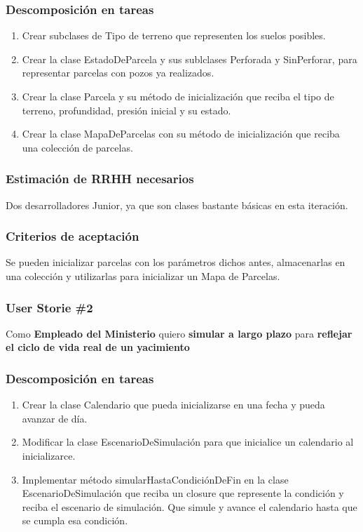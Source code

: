 \documentclass[10pt,a4paper]{article}
\begin{document}
\subsubsection*{Descomposición en tareas}

\begin{enumerate}
  \item Crear subclases de Tipo de terreno que representen los suelos posibles.
  \item Crear la clase EstadoDeParcela y sus sublclases Perforada y SinPerforar, para representar parcelas con pozos ya realizados.
  \item Crear la clase Parcela y su método de inicialización que reciba el tipo de terreno, profundidad, presión inicial y su estado.
  \item Crear la clase MapaDeParcelas con su método de inicialización que reciba una colección de parcelas.
\end{enumerate}

\subsubsection*{Estimación de RRHH necesarios}

Dos desarrolladores Junior, ya que son clases bastante básicas en esta iteración.

\subsubsection*{Criterios de aceptación}

Se pueden inicializar parcelas con los parámetros dichos antes, almacenarlas en una colección y utilizarlas para inicializar un Mapa de Parcelas.

\subsubsection{User Storie \#2}
\begin{framed}
  Como \textbf{Empleado del Ministerio} quiero \textbf{simular a largo plazo} para \textbf{reflejar el ciclo de vida real de un yacimiento}
\end{framed}

\subsubsection*{Descomposición en tareas}

\begin{enumerate}
  \item Crear la clase Calendario que pueda inicializarse en una fecha y pueda avanzar de día.
  \item Modificar la clase EscenarioDeSimulación para que inicialice un calendario al inicializarce.
  \item Implementar método simularHastaCondiciónDeFin en la clase EscenarioDeSimulación que reciba un closure que represente la condición y reciba el escenario de simulación. Que simule y avance el calendario hasta que se cumpla esa condición.
\end{enumerate}
\end{document}
